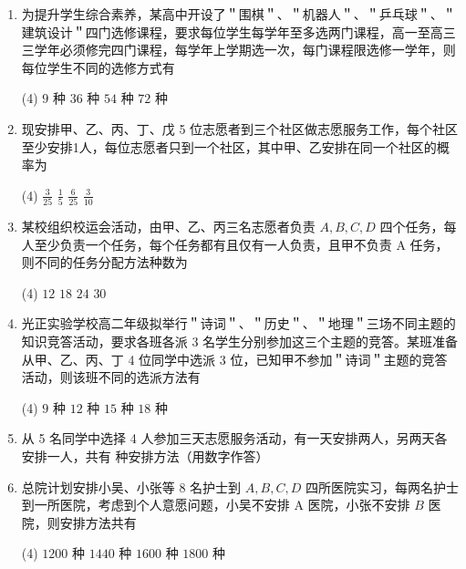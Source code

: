 \begin{enumerate}
    \item 为提升学生综合素养，某高中开设了＂围棋＂、＂机器人＂、＂乒乓球＂、＂建筑设计＂四门选修课程，要求每位学生每学年至多选两门课程，高一至高三三学年必须修完四门课程，每学年上学期选一次，每门课程限选修一学年，则每位学生不同的选修方式有
          \begin{tasks}(4)
              \task $9$ 种
              \task $36$ 种
              \task $54$ 种
              \task $72$ 种
          \end{tasks}


    \item 现安排甲、乙、丙、丁、戊 5 位志愿者到三个社区做志愿服务工作，每个社区至少安排1人，每位志愿者只到一个社区，其中甲、乙安排在同一个社区的概率为
          \begin{tasks}(4)
              \task $\frac{3}{25}$
              \task $\frac{1}{5}$
              \task $\frac{6}{25}$
              \task $\frac{3}{10}$
          \end{tasks}

    \item 某校组织校运会活动，由甲、乙、丙三名志愿者负责 $A, B, C, D$ 四个任务，每人至少负责一个任务，每个任务都有且仅有一人负责，且甲不负责 A 任务，则不同的任务分配方法种数为
          \begin{tasks}(4)
              \task $12$
              \task $18$
              \task $24$
              \task $30$
          \end{tasks}

    \item 光正实验学校高二年级拟举行＂诗词＂、＂历史＂、＂地理＂三场不同主题的知识竞答活动，要求各班各派 3 名学生分别参加这三个主题的竞答。某班准备从甲、乙、丙、丁 4 位同学中选派 3 位，已知甲不参加＂诗词＂主题的竞答活动，则该班不同的选派方法有
          \begin{tasks}(4)
              \task $9$ 种
              \task $12$ 种
              \task $15$ 种
              \task $18$ 种
          \end{tasks}

    \item 从 5 名同学中选择 4 人参加三天志愿服务活动，有一天安排两人，另两天各安排一人，共有 \underline{\hspace{2cm}}种安排方法（用数字作答）

    \item 总院计划安排小吴、小张等 8 名护士到 $A, B, C, D$ 四所医院实习，每两名护士到一所医院，考虑到个人意愿问题，小吴不安排 A 医院，小张不安排 $B$ 医院，则安排方法共有
          \begin{tasks}(4)
              \task $1200$ 种
              \task $1440$ 种
              \task $1600$ 种
              \task $1800$ 种
          \end{tasks}

\end{enumerate}

